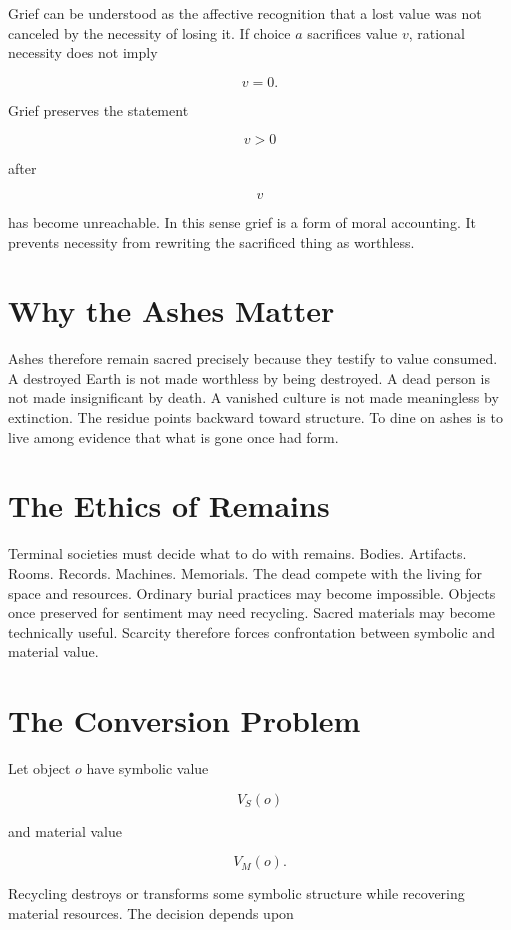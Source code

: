 \documentclass[11pt,oneside]{book}
\theoremstyle{definition}
\theoremstyle{remark}
\begin{document}
Grief can be understood as the affective recognition that a lost value was not canceled by the
necessity of losing it. If choice \(a\) sacrifices value \(v\), rational necessity does not imply

\[
v=0.
\]

Grief preserves the statement

\[
v>0
\]

after

\[
v
\]

has become unreachable. In this sense grief is a form of moral accounting. It prevents necessity
from rewriting the sacrificed thing as worthless.

\section{Why the Ashes Matter}

Ashes therefore remain sacred precisely because they testify to value consumed. A destroyed Earth is
not made worthless by being destroyed. A dead person is not made insignificant by death. A vanished
culture is not made meaningless by extinction. The residue points backward toward structure. To dine
on ashes is to live among evidence that what is gone once had form.

\section{The Ethics of Remains}

Terminal societies must decide what to do with remains. Bodies. Artifacts. Rooms. Records. Machines.
Memorials. The dead compete with the living for space and resources. Ordinary burial practices may
become impossible. Objects once preserved for sentiment may need recycling. Sacred materials may
become technically useful. Scarcity therefore forces confrontation between symbolic and material
value.

\section{The Conversion Problem}

Let object \(o\) have symbolic value

\[
V_S(o)
\]

and material value

\[
V_M(o).
\]

Recycling destroys or transforms some symbolic structure while recovering material resources. The
decision depends upon
\end{document}
